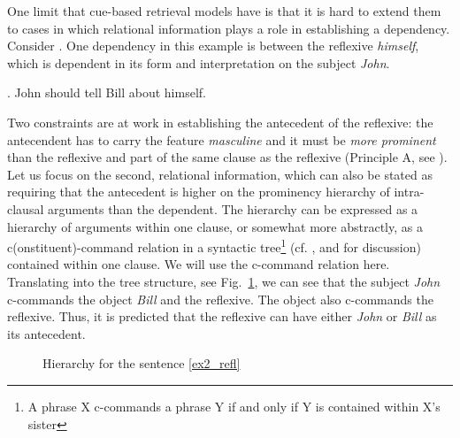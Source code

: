\documentclass[11pt]{article} %
\begin{document}
One limit that cue-based retrieval models have is that it is hard to extend them to cases in which relational information plays a role in establishing a dependency. Consider \Next. One dependency in this example is between the reflexive \textit{himself}, which is dependent in its form and interpretation on the subject \textit{John}.

\ex. John should tell Bill about himself.\label{ex2_refl}

Two constraints are at work in establishing the antecedent of the reflexive: the antecendent has to carry the feature \emph{masculine} and it must be \emph{more prominent} than the reflexive and part of the same clause as the reflexive (Principle A, see \cite{chomsky81, reinhart+93}). Let us focus on the second, relational information, which can also be stated as requiring that the antecedent is higher on the prominency hierarchy of intra-clausal arguments than the dependent. The hierarchy can be expressed as a hierarchy of arguments within one clause, or somewhat more abstractly, as a c(onstituent)-command relation in a syntactic tree\footnote{A phrase X c-commands a phrase Y if and only if Y is contained within X's sister} (cf. \citealt{reinhart83}, and \citealt{buring05} for discussion) contained within one clause. We will use the c-command relation here. Translating \Last into the tree structure, see Fig.~\ref{fig_tree1}, we can see that the subject \textit{John} c-commands the object \textit{Bill} and the reflexive. The object also c-commands the reflexive. Thus, it is predicted that the reflexive can have either \textit{John} or \textit{Bill} as its antecedent.

\begin{figure}
    \caption{Hierarchy for the sentence \ref{ex2_refl}\label{fig_tree1}}
\end{figure}
\end{document}
